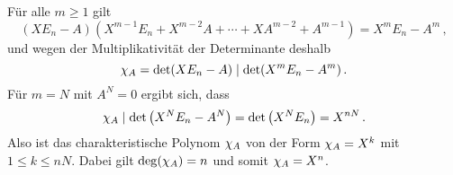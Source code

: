 \section{}





\addtocounter{subsection}{1}





\subsection{}

Für alle $m \geq 1$ gilt
\[
    (X E_n - A)(X^{m-1} E_n + X^{m-2} A + \dotsb + X A^{m-2} + A^{m-1})
  = X^m E_n - A^m \,,
\]
und wegen der Multiplikativität der Determinante deshalb
\[
            \chi_{A}
  =         \det(X E_n - A)
  \mathrel{|}  \det(X^m E_n - A^m) \,.
\]
Für $m = N$ mit $A^N = 0$ ergibt sich, dass
\[
            \chi_{A}
  \mathrel{|}  \det\left( X^N E_n - A^N \right)
  =         \det\left( X^N E_n \right)
  =         X^{nN} \,.
\]
Also ist das charakteristische Polynom $\chi_{A}$ von der Form $\chi_{A} = X^k$ mit $1 \leq k \leq nN$.
Dabei gilt $\deg(\chi_{A}) = n$ und somit $\chi_{A} = X^n$.
